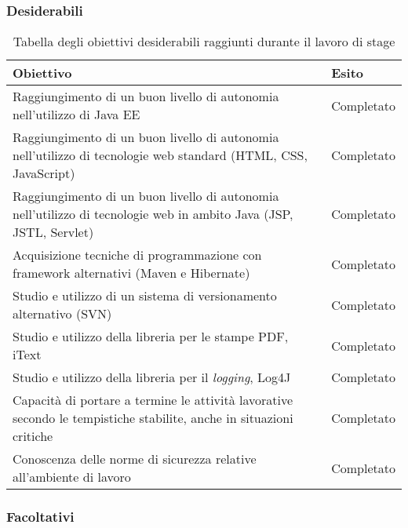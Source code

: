 \subsubsection{Desiderabili}

	\begin{table}[H]
		\def\arraystretch{1.2}
		\begin{tabular}{ | p{10cm} | p{2cm} | }
		
		\rowcolor{Gray}
		\hline \textbf{Obiettivo} & \textbf{Esito} \\ \hline
		
		Raggiungimento di un buon livello di autonomia nell'utilizzo di Java EE & Completato \\ \hline
		Raggiungimento di un buon livello di autonomia nell'utilizzo di tecnologie web standard (HTML, CSS, JavaScript) & Completato \\ \hline
		Raggiungimento di un buon livello di autonomia nell'utilizzo di tecnologie web in ambito Java (JSP, JSTL, Servlet\glossario ) & Completato \\ \hline
		Acquisizione tecniche di programmazione con framework alternativi (Maven e Hibernate) & Completato \\ \hline
		Studio e utilizzo di un sistema di versionamento alternativo (SVN) & Completato \\ \hline
		Studio e utilizzo della libreria per le stampe PDF, iText & Completato \\ \hline
		Studio e utilizzo della libreria per il \textit{logging}, Log4J & Completato \\ \hline
		Capacità di portare a termine le attività lavorative secondo le tempistiche stabilite, anche in situazioni critiche & Completato \\ \hline
		Conoscenza delle norme di sicurezza relative all'ambiente di lavoro & Completato \\ \hline
		
		\end{tabular}
		\vspace{1mm}
		\caption{Tabella degli obiettivi desiderabili raggiunti durante il lavoro di stage}
	\end{table}


\subsubsection{Facoltativi}

